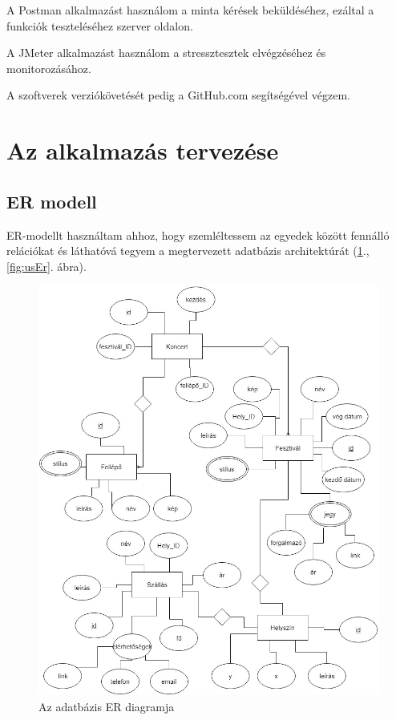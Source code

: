 A Postman alkalmazást használom a minta kérések beküldéséhez, ezáltal a funkciók teszteléséhez szerver oldalon.

A JMeter alkalmazást használom a stressztesztek elvégzéséhez és monitorozásához.

A szoftverek verziókövetését pedig a GitHub.com segítségével végzem.

\section{Az alkalmazás tervezése}

\subsection{ER modell}

ER-modellt használtam ahhoz, hogy szemléltessem az egyedek között fennálló relációkat és láthatóvá tegyem a megtervezett adatbázis architektúrát (\ref{fig:er}., \ref{fig:usEr}. ábra).

\begin{figure}
\centering
\includegraphics[scale=0.6]{kepek/er.jpg}
\caption{Az adatbázis ER diagramja}
\label{fig:er}
\end{figure}

